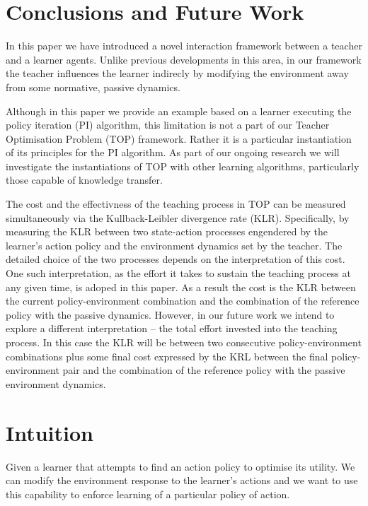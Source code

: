 \documentclass[letterpaper]{aamas2009}
\begin{document}
\section{Conclusions and Future Work}

In this paper we have introduced a novel interaction framework between
a teacher and a learner agents. Unlike previous developments in this
area, in our framework the teacher influences the learner indirecly by
modifying the environment away from some normative, passive
dynamics. 

Although in this paper we provide an example based on a learner
executing the policy iteration (PI) algorithm, this limitation is not
a part of our Teacher Optimisation Problem (TOP) framework. Rather it
is a particular instantiation of its principles for the PI
algorithm. As part of our ongoing research we will investigate the
instantiations of TOP with other learning algorithms, particularly
those capable of knowledge transfer.

The cost and the effectivness of the teaching process in TOP can
be measured simultaneously via the Kullback-Leibler divergence rate
(KLR). Specifically, by measuring the KLR between two state-action
processes engendered by the learner's action policy and the
environment dynamics set by the teacher. The detailed choice of the
two processes depends on the interpretation of this cost. One such
interpretation, as the effort it takes to sustain the teaching process
at any given time, is adoped in this paper. As a result the cost is
the KLR between the current policy-environment combination and the
combination of the reference policy with the passive
dynamics. However, in our future work we intend to explore a different
interpretation -- the total effort invested into the teaching
process. In this case the KLR will be between two consecutive
policy-environment combinations plus some final cost expressed by the
KRL between the final policy-environment pair and the combination of
the reference policy with the passive environment dynamics. 





\newpage
\appendix
\section{Intuition}
Given a learner that attempts to find an action policy to optimise its
utility. We can modify the environment response to the learner's
actions and we want to use this capability to enforce learning of a
particular policy of action.
\end{document}
